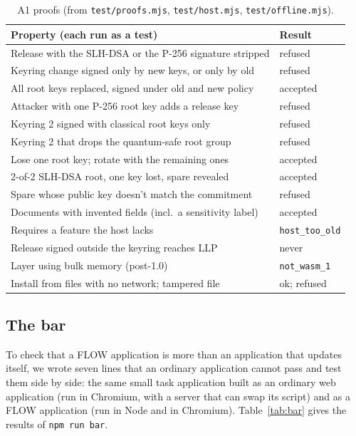 \documentclass[10pt,twocolumn]{article}
\newcommand{\code}[1]{\texttt{#1}}
\begin{document}
\begin{table}[t]
\centering\footnotesize
\begin{tabularx}{\columnwidth}{@{}Xl@{}}
\toprule
Property (each run as a test) & Result \\
\midrule
Release with the SLH-DSA or the P-256 signature stripped & refused \\
Keyring change signed only by new keys, or only by old & refused \\
All root keys replaced, signed under old and new policy & accepted \\
Attacker with one P-256 root key adds a release key & refused \\
Keyring 2 signed with classical root keys only & refused \\
Keyring 2 that drops the quantum-safe root group & refused \\
Lose one root key; rotate with the remaining ones & accepted \\
2-of-2 SLH-DSA root, one key lost, spare revealed & accepted \\
Spare whose public key doesn't match the commitment & refused \\
Documents with invented fields (incl.\ a sensitivity label) & accepted \\
Requires a feature the host lacks & \code{host\_too\_old} \\
Release signed outside the keyring reaches LLP & never \\
Layer using bulk memory (post-1.0) & \code{not\_wasm\_1} \\
Install from files with no network; tampered file & ok; refused \\
\bottomrule
\end{tabularx}
\caption{A1 proofs (from \code{test/proofs.mjs}, \code{test/host.mjs}, \code{test/offline.mjs}).}
\label{tab:proofs}
\end{table}

\subsection{The bar}

To check that a FLOW application is more than an application that updates itself, we wrote seven
lines that an ordinary application cannot pass and test them side by side: the same small task
application built as an ordinary web application (run in Chromium, with a server that can swap its
script) and as a FLOW application (run in Node and in Chromium). Table~\ref{tab:bar} gives the
results of \code{npm run bar}.
\end{document}
